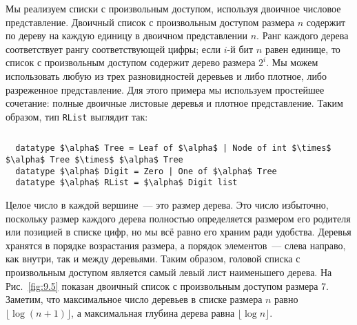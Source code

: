 \begin{frame}[fragile]{}
Мы реализуем списки с произвольным доступом, используя двоичное
числовое представление. Двоичный список с произвольным доступом
размера $n$ содержит по дереву на каждую единицу в двоичном
представлении $n$. Ранг каждого дерева соответствует рангу
соответствующей цифры; если $i$-й бит $n$ равен единице, то список с
произвольным доступом содержит дерево размера $2^i$. Мы можем
использовать любую из трех разновидностей деревьев и либо плотное,
либо разреженное представление. Для этого примера мы используем
простейшее сочетание: полные двоичные листовые деревья и плотное
представление. Таким образом, тип \lstinline!RList! выглядит так:

\inputminted[firstline=3]{haskell}{code/DenseFullTreeRAL.hs}
\end{frame}

\begin{frame}[fragile]{}

\begin{lstlisting}
  datatype $\alpha$ Tree = Leaf of $\alpha$ | Node of int $\times$ $\alpha$ Tree $\times$ $\alpha$ Tree
  datatype $\alpha$ Digit = Zero | One of $\alpha$ Tree
  datatype $\alpha$ RList = $\alpha$ Digit list
\end{lstlisting}
Целое число в каждой вершине~--- это размер дерева. Это число
избыточно, поскольку размер каждого дерева полностью определяется
размером его родителя или позицией в списке цифр, но мы всё равно его
храним ради удобства. Деревья хранятся в порядке возрастания размера,
а порядок элементов~--- слева направо, как внутри, так и между
деревьями. Таким образом, головой списка с произвольным доступом
является самый левый лист наименьшего дерева. На Рис.~\ref{fig:9.5}
показан двоичный список с произвольным доступом размера 7. Заметим,
что максимальное число деревьев в списке размера $n$ равно
$\lfloor \log (n+1) \rfloor$, а максимальная глубина дерева равна
$\lfloor \log n \rfloor$.

\end{frame}

